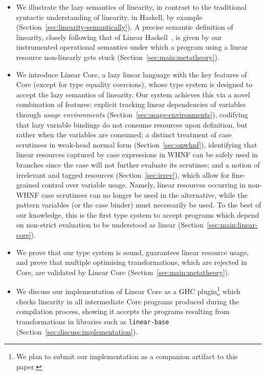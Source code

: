 \documentclass[acmsmall,review,screen]{acmart}
\newcommand{\ROUNDTWO}[1]{{\color{red}#1}}
\begin{document}
\begin{itemize}

\item We \ROUNDTWO{illustrate} the \ROUNDTWO{lazy semantics} of linearity, in
contrast to the \ROUNDTWO{traditional} syntactic \ROUNDTWO{understanding
of} linearity, in Haskell, by example (Section~\ref{sec:linearity-semantically}).
%
A precise \ROUNDTWO{semantic definition of} linearity, \ROUNDTWO{closely
following that of Linear Haskell~\cite{cite:linearhaskell}}, is given by
our instrumented operational semantics under which a program using a
linear resource non-linearly gets stuck
(Section~\ref{sec:main:metatheory}).

\item We introduce Linear Core, a \ROUNDTWO{lazy} linear language with
the key features of Core (except for type equality coercions), whose type
system \ROUNDTWO{is designed to accept the lazy} semantics of
linearity. \ROUNDTWO{Our system achieves this via a novel combination
  of features: explicit tracking linear dependencies of variables
  through \emph{usage environments}
  (Section~\ref{sec:usage-environments}), codifying that lazy variable
  bindings do not consume resources upon definition, but rather when
  the variables are consumed;
  a distinct treatment of case
  scrutinees in weak-head normal form (Section~\ref{sec:onwhnf}),
  identifying that linear resources captured by case expressions in
  WHNF can be safely used in branches since the case will not further
  evaluate its scrutinee; and a notion of irrelevant and tagged resources
  (Section~\ref{sec:irrev}), which allow for fine-grained control over
  variable usage. Namely, linear resources occurring in non-WHNF case
  scrutinees can no longer be used in the alternative, while the
  pattern variables (or the case binder) must necessarily be used. } 
%
To the best of our
knowledge, this is the first type system \ROUNDTWO{to accept programs
which depend on non-strict evaluation to be understood as linear}
(Section~\ref{sec:main:linear-core}).

\item We prove that our type system is sound, guarantees linear resource usage, and
    prove that multiple optimising transformations, which are rejected in Core,
        are validated by Linear Core (Section~\ref{sec:main:metatheory}).

\item We discuss our implementation of Linear Core as a GHC
  plugin\footnote{We plan to submit our implementation as a companion
    artifact to this paper.} which checks linearity in
all intermediate Core programs produced during the compilation process, showing
it accepts the programs resulting from transformations in libraries such as
\texttt{linear-base} (Section~\ref{sec:discuss:implementation}).

\end{itemize}
\end{document}
